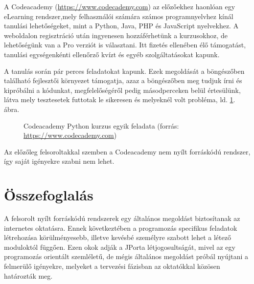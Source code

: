 A Codeacademy (\url{https://www.codecademy.com}) az előzőekhez haonlóan egy eLearning rendszer,mely felhasználói számára számos programnyelvhez kínál tanulási lehetőségeket, mint a Python, Java, PHP és JavaScript nyelvekhez. A weboldalon regisztráció után ingyenesen hozzáférhetünk a kurzusokhoz, de lehetőségünk van a Pro verziót is választani. Itt fizetés ellenében élő támogatást, tanulási egységenkénti ellenőrző kvízt és egyéb szolgáltatásokat kapunk. \cite{CodeacademyPro}

A tanulás során pár perces feladatokat kapunk. Ezek megoldását a böngészőben található fejlesztői környezet támogatja, azaz a böngészőben meg tudjuk írni és kipróbálni a kódunkat, megfelelőségéről pedig másodperceken belül értesülünk, látva mely tesztesetek futtotak le sikeresen és melyeknél volt probléma, ld. \ref{fig:codeacademy}. ábra.

\begin{figure}[h]
    \centering
    \caption[Codeacademy Python kurzus egyik feladata]{Codeacademy Python kurzus egyik feladata (forrás: \url{https://www.codecademy.com})}
    \label{fig:codeacademy}
\end{figure}

Az előzőleg felsoroltakkal szemben a Codeacademy nem nyílt forráskódú rendszer, így saját igényekre szabni nem lehet.

\section{Összefoglalás}

A felsorolt nyílt forráskódú rendszerek egy általános megoldást biztosítanak az internetes oktatásra. Ennek következtében a programozás specifikus feladatok létrehozása körülményesebb, illetve kevésbé személyre szabott lehet a létező moduloktól függően. Ezen okok adják a JPorta létjogosultságát, mivel az egy programozás orientált szemléletű, de mégis általános megoldást próbál nyújtani a felmerülő igényekre, melyeket a tervezési fázisban az oktatókkal közösen határozták meg.